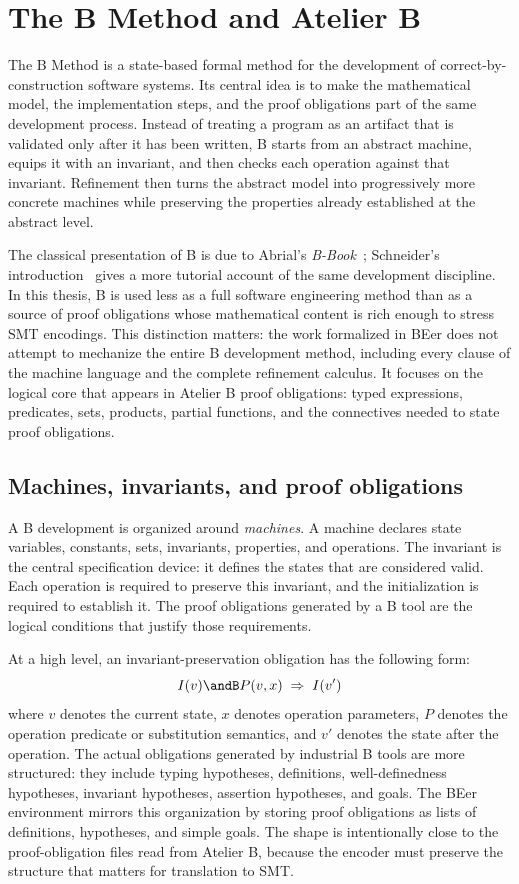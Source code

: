 \section{The B Method and Atelier B}
\label{sec:b-method-atelier-b}
\label{sec:b-method}

The B Method is a state-based formal method for the development of correct-by-construction software systems.
Its central idea is to make the mathematical model, the implementation steps, and the proof obligations part of the same development process.
Instead of treating a program as an artifact that is validated only after it has been written, B starts from an abstract machine, equips it with an invariant, and then checks each operation against that invariant.
Refinement then turns the abstract model into progressively more concrete machines while preserving the properties already established at the abstract level.

The classical presentation of B is due to Abrial's \emph{B-Book}~\cite{abrial1996bbook}; Schneider's introduction~\cite{schneider2001bmethod} gives a more tutorial account of the same development discipline.
In this thesis, B is used less as a full software engineering method than as a source of proof obligations whose mathematical content is rich enough to stress SMT encodings.
This distinction matters: the work formalized in BEer does not attempt to mechanize the entire B development method, including every clause of the machine language and the complete refinement calculus.
It focuses on the logical core that appears in Atelier B proof obligations: typed expressions, predicates, sets, products, partial functions, and the connectives needed to state proof obligations.

\subsection{Machines, invariants, and proof obligations}

A B development is organized around \emph{machines}.
A machine declares state variables, constants, sets, invariants, properties, and operations.
The invariant is the central specification device: it defines the states that are considered valid.
Each operation is required to preserve this invariant, and the initialization is required to establish it.
The proof obligations generated by a B tool are the logical conditions that justify those requirements.

At a high level, an invariant-preservation obligation has the following form:
\[
  I(v) \andB P(v, x) \;\Rightarrow\; I(v')
\]
where \(v\) denotes the current state, \(x\) denotes operation parameters, \(P\) denotes the operation predicate or substitution semantics, and \(v'\) denotes the state after the operation.
The actual obligations generated by industrial B tools are more structured: they include typing hypotheses, definitions, well-definedness hypotheses, invariant hypotheses, assertion hypotheses, and goals.
The BEer environment mirrors this organization by storing proof obligations as lists of definitions, hypotheses, and simple goals.
The shape is intentionally close to the proof-obligation files read from Atelier B, because the encoder must preserve the structure that matters for translation to SMT.

